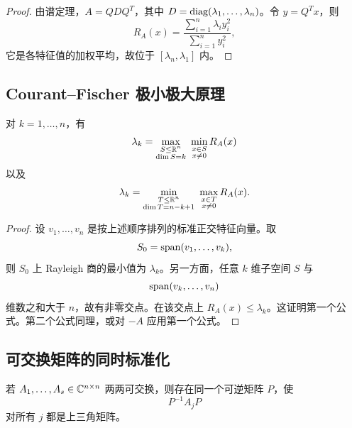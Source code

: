 \begin{proof}
由谱定理，$A=QDQ^T$，其中 $D=\operatorname{diag}(\lambda_1,\ldots,\lambda_n)$。令 $y=Q^Tx$，则
\begin{equation}
 R_A(x)=\frac{\sum_{i=1}^n\lambda_i y_i^2}
 {\sum_{i=1}^n y_i^2},
\end{equation}
它是各特征值的加权平均，故位于 $[\lambda_n,\lambda_1]$ 内。
\end{proof}

\subsection{Courant--Fischer 极小极大原理}

\begin{theorem}
对 $k=1,\ldots,n$，有
\begin{equation}
 \lambda_k
 =\max_{\substack{S\leq\mathbb R^n\\\dim S=k}}
 \ \min_{\substack{x\in S\\x\neq0}}R_A(x)
\end{equation}
以及
\begin{equation}
 \lambda_k
 =\min_{\substack{T\leq\mathbb R^n\\\dim T=n-k+1}}
 \ \max_{\substack{x\in T\\x\neq0}}R_A(x).
\end{equation}
\end{theorem}

\begin{proof}
设 $v_1,\ldots,v_n$ 是按上述顺序排列的标准正交特征向量。取
\begin{equation}
 S_0=\operatorname{span}(v_1,\ldots,v_k),
\end{equation}
则 $S_0$ 上 Rayleigh 商的最小值为 $\lambda_k$。另一方面，任意 $k$ 维子空间 $S$ 与
\begin{equation}
 \operatorname{span}(v_k,\ldots,v_n)
\end{equation}
维数之和大于 $n$，故有非零交点。在该交点上 $R_A(x)\leq\lambda_k$。这证明第一个公式。第二个公式同理，或对 $-A$ 应用第一个公式。
\end{proof}

\subsection{可交换矩阵的同时标准化}

\begin{theorem}[同时上三角化]
若 $A_1,\ldots,A_s\in\mathbb C^{n\times n}$ 两两可交换，则存在同一个可逆矩阵 $P$，使
\begin{equation}
 P^{-1}A_jP
\end{equation}
对所有 $j$ 都是上三角矩阵。
\end{theorem}

